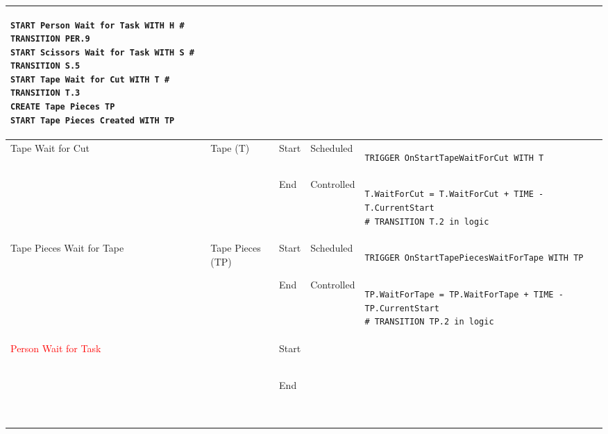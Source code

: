 \begin{longtable}{@{}>{\raggedright\arraybackslash}p{1.8cm}>{\raggedright\arraybackslash}p{2.1cm}>{\raggedright\arraybackslash}p{0.9cm}>{\raggedright\arraybackslash}p{2.2cm}>{\raggedright\arraybackslash}p{8.75cm}@{}}
\begin{lstlisting}[language=CMPseudo]
START Person Wait for Task WITH H # TRANSITION PER.9
START Scissors Wait for Task WITH S # TRANSITION S.5
START Tape Wait for Cut WITH T # TRANSITION T.3
CREATE Tape Pieces TP
START Tape Pieces Created WITH TP
\end{lstlisting}             \\ \midrule
  Tape Wait for Cut         & Tape (T)                                & Start & Scheduled  & 
\begin{lstlisting}[language=CMPseudo]
TRIGGER OnStartTapeWaitForCut WITH T
\end{lstlisting}             \\
  &                                                          & End   & Controlled & 
\begin{lstlisting}[language=CMPseudo]
T.WaitForCut = T.WaitForCut + TIME - T.CurrentStart
# TRANSITION T.2 in logic
\end{lstlisting}             \\ \midrule
  Tape Pieces Wait for Tape & Tape Pieces (TP)                       & Start & Scheduled  & 
\begin{lstlisting}[language=CMPseudo]
TRIGGER OnStartTapePiecesWaitForTape WITH TP
\end{lstlisting}             \\
  &                                                          & End   & Controlled & 
\begin{lstlisting}[language=CMPseudo]
TP.WaitForTape = TP.WaitForTape + TIME - TP.CurrentStart
# TRANSITION TP.2 in logic
\end{lstlisting}             \\ \midrule
\textcolor{Red}{Person Wait for Task}      &     & Start &   & 
\begin{lstlisting}[language=CMPseudo]
 
\end{lstlisting}             \\
  &                                                          & End   &  & 
\begin{lstlisting}[language=CMPseudo]
 
 
\end{lstlisting}             \\ \bottomrule
  \end{longtable}